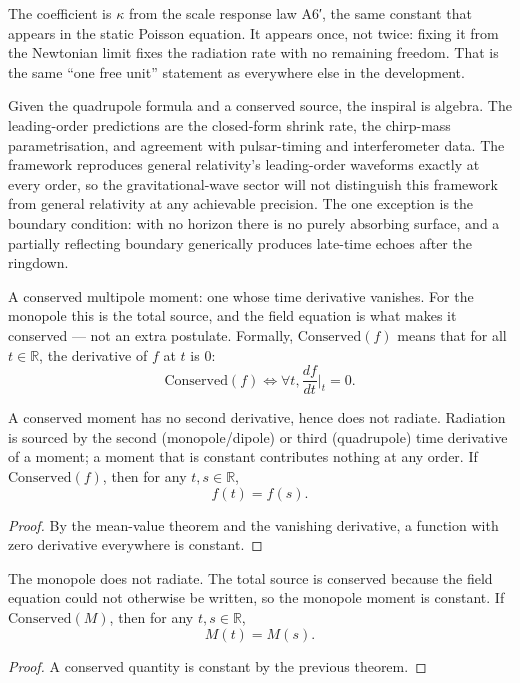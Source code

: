 The coefficient is $\kappa$ from the scale response law A6′, the same constant that appears in the static Poisson equation. It appears once, not twice: fixing it from the Newtonian limit fixes the radiation rate with no remaining freedom. That is the same ``one free unit'' statement as everywhere else in the development.

Given the quadrupole formula and a conserved source, the inspiral is algebra. The leading-order predictions are the closed-form shrink rate, the chirp-mass parametrisation, and agreement with pulsar-timing and interferometer data. The framework reproduces general relativity's leading-order waveforms exactly at every order, so the gravitational-wave sector will not distinguish this framework from general relativity at any achievable precision. The one exception is the boundary condition: with no horizon there is no purely absorbing surface, and a partially reflecting boundary generically produces late-time echoes after the ringdown.

\begin{definition}
A conserved multipole moment: one whose time derivative vanishes. For the monopole this is the total source, and the field equation is what makes it conserved — not an extra postulate. Formally, $\text{Conserved}(f)$ means that for all $t \in \mathbb{R}$, the derivative of $f$ at $t$ is $0$:
\[
\text{Conserved}(f) \iff \forall t, \frac{df}{dt}\bigg|_t = 0.
\]
\end{definition}

\begin{theorem}
A conserved moment has no second derivative, hence does not radiate. Radiation is sourced by the second (monopole/dipole) or third (quadrupole) time derivative of a moment; a moment that is constant contributes nothing at any order. If $\text{Conserved}(f)$, then for any $t, s \in \mathbb{R}$,
\[
f(t) = f(s).
\]
\begin{proof}
By the mean-value theorem and the vanishing derivative, a function with zero derivative everywhere is constant.
\end{proof}
\end{theorem}

\begin{theorem}
The monopole does not radiate. The total source is conserved because the field equation could not otherwise be written, so the monopole moment is constant. If $\text{Conserved}(M)$, then for any $t, s \in \mathbb{R}$,
\[
M(t) = M(s).
\]
\begin{proof}
A conserved quantity is constant by the previous theorem.
\end{proof}
\end{theorem}

